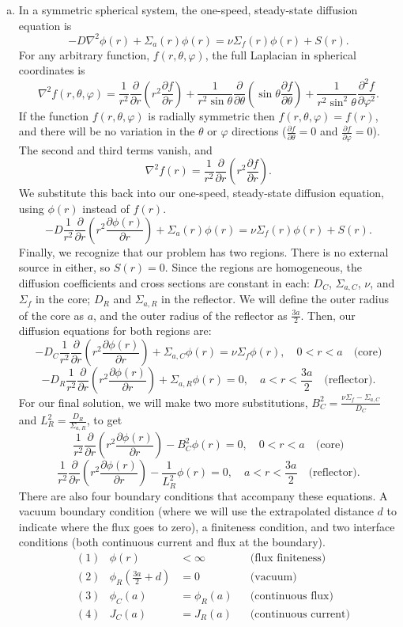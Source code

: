 \documentclass{report}
\newcommand{\lap}{\nabla^2}
\newcommand{\p}{\partial}
\begin{document}
\begin{enumerate}[a)]

\item

 In a symmetric spherical system, the one-speed, steady-state diffusion equation is
$$ -D \lap \phi(r) + \Sigma_a (r) \phi(r) = \nu \Sigma_f(r) \phi(r) + S(r) .$$
For any arbitrary function, $f(r,\theta,\varphi)$, the full Laplacian in spherical coordinates is
$$ \lap f(r,\theta,\varphi) = \frac{1}{r^2}\frac{\p}{\p r}\left(r^2 \frac{\p f}{\p r}\right) +  \frac{1}{r^2 \sin\theta} \frac{\p}{\p \theta}\left(\sin\theta \frac{\p f}{\p \theta}\right) + \frac{1}{r^2 \sin^2 \theta} \frac{\p^2 f}{\p \varphi^2} .$$
If the function $f(r,\theta,\varphi)$ is radially symmetric then $f(r,\theta,\varphi) = f(r)$, and there will be no variation in the $\theta$ or $\varphi$ directions ($\frac{\p f}{\p \theta} = 0$ and $\frac{\p f}{\p \varphi} = 0$).  The second and third terms vanish, and
$$ \lap f(r) = \frac{1}{r^2}\frac{\p}{\p r}\left(r^2 \frac{\p f}{\p r}\right) .$$
We substitute this back into our one-speed, steady-state diffusion equation, using $\phi(r)$ instead of $f(r)$.
$$ -D \frac{1}{r^2}\frac{\p}{\p r}\left(r^2 \frac{\p \phi(r)}{\p r}\right) + \Sigma_a (r) \phi(r) = \nu \Sigma_f(r) \phi(r) + S(r) .$$
Finally, we recognize that our problem has two regions. There is no external source in either, so $S(r) = 0$. Since the regions are homogeneous, the diffusion coefficients and cross sections are constant in each: $D_C$, $\Sigma_{a,C}$, $\nu$, and $\Sigma_f$ in the core; $D_R$ and $\Sigma_{a,R}$ in the reflector. We will define the outer radius of the core as $a$, and the outer radius of the reflector as $\frac{3a}{2}$. Then, our diffusion equations for both regions are:
$$ -D_C \frac{1}{r^2}\frac{\p}{\p r}\left(r^2 \frac{\p \phi(r)}{\p r}\right) + \Sigma_{a,C} \phi(r) = \nu \Sigma_f \phi(r), \quad 0 < r < a \quad\text{(core)} $$
$$ -D_R \frac{1}{r^2}\frac{\p}{\p r}\left(r^2 \frac{\p \phi(r)}{\p r}\right) + \Sigma_{a,R}\phi(r) = 0, \quad a < r < \frac{3a}{2} \quad\text{(reflector)}.$$
For our final solution, we will make two more substitutions, $B_C^2 = \frac{\nu\Sigma_f - \Sigma_{a,C}}{D_C}$ and $L_R^2 = \frac{D_R}{\Sigma_{a,R}}$, to get
$$ \frac{1}{r^2}\frac{\p}{\p r}\left(r^2 \frac{\p \phi(r)}{\p r}\right) - B_C^2 \phi(r) = 0, \quad 0 < r < a \quad\text{(core)} $$
$$ \frac{1}{r^2}\frac{\p}{\p r}\left(r^2 \frac{\p \phi(r)}{\p r}\right) - \frac{1}{L_R^2}\phi(r) = 0, \quad a < r < \frac{3a}{2} \quad\text{(reflector)} .$$
There are also four boundary conditions that accompany these equations. A vacuum boundary condition (where we will use the extrapolated distance $d$ to indicate where the flux goes to zero), a finiteness condition, and two interface conditions (both continuous current and flux at the boundary). 
\begin{align*}
&(1)& \phi(r) &< \infty  						& &\text{(flux finiteness)} \\
&(2)& \phi_R\left(\frac{3a}{2} + d\right) &= 0 	& &\text{(vacuum)} \\
&(3)& \phi_C(a) &= \phi_R(a)					& &\text{(continuous flux)} \\
&(4)& J_C(a) &= J_R(a)							& &\text{(continuous current)}
\end{align*} 


\end{enumerate}
\end{document}
